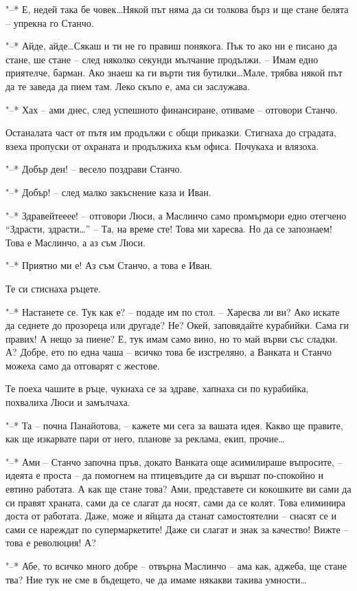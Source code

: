 \documentclass[ebook,openany,12pt]{memoir}
\begin{document}
"--* Е, недей така бе човек\ldots Някой път няма да си толкова бърз и ще стане белята – упрекна го Станчо.

"--* Айде, айде\ldots Сякаш и ти не го правиш понякога. Пък то ако ни е писано да стане, ше стане – след няколко секунди мълчание продължи. – Имам едно приятелче, барман. Ако знаеш ка ги върти тия бутилки\ldots Мале, трябва някой път да те заведа да пием там. Леко скъпо е, ама си заслужава.

"--* Хах – ами днес, след успешното финансиране, отиваме – отговори Станчо.

Останалата част от пътя им продължи с общи приказки. Стигнаха до сградата, взеха пропуски от охраната и продължиха към офиса. Почукаха и влязоха.

"--* Добър ден! – весело поздрави Станчо.

"--* Добър! – след малко закъснение каза и Иван.

"--* Здравейтееее! – отговори Люси, а Маслинчо само промърмори едно отегчено ``Здрасти, здрасти\ldots'' – Та, на време сте! Това ми харесва. Но да се запознаем! Това е Маслинчо, а аз съм Люси.

"--* Приятно ми е! Аз съм Станчо, а това е Иван. 

Те си стиснаха ръцете. 

"--* Настанете се. Тук как е? – подаде им по стол. – Харесва ли ви? Ако искате да седнете до прозореца или другаде? Не? Окей, заповядайте курабийки. Сама ги правих! А нещо за пиене? Е, тук имам само вино, но то май върви със сладки. А? Добре, ето по една чаша – всичко това бе изстреляно, а Ванката и Станчо можеха само да отговарят с жестове. 

Те поеха чашите в ръце, чукнаха се за здраве, хапнаха си по курабийка, похвалиха Люси и замълчаха.

"--* Та -- почна Панайотова, – кажете ми сега за вашата идея. Какво ще правите, как ще изкарвате пари от него, планове за реклама, екип, прочие\ldots

"--* Ами -- Станчо започна пръв, докато Ванката още асимилираше въпросите, – идеята е проста – да помогнем на птицевъдите да си вършат по-спокойно и евтино работата. А как ще стане това? Ами, представете си кокошките ви сами да си правят храната, сами да се слагат да носят, сами да се колят. Това елиминира доста от работата. Даже, може и яйцата да станат самостоятелни – снасят се и сами се нареждат по супермаркетите! Даже си слагат и знак за качество! Вижте – това е революция! А?

"--* Абе, то всичко много добре – отвърна Маслинчо – ама как, аджеба, ще стане тва? Ние тук не сме в бъдещето, че да имаме някакви такива умности\ldots
\end{document}
